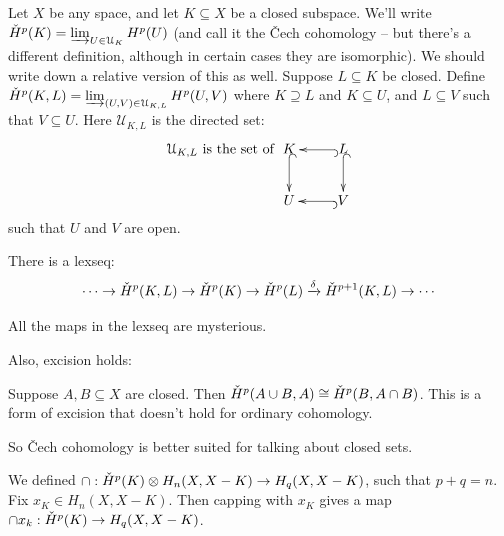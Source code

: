 Let $X$ be any space, and let $K\subseteq X$ be a closed subspace. We'll write $\check{H}^p(K)=\varinjlim_{U\in\mathcal{U}_K} H^p(U)$ (and call it the \v{C}ech cohomology -- but there's a different definition, although in certain cases they are isomorphic). We should write down a relative version of this as well. Suppose $L\subseteq K$ be closed. Define $\check{H}^p(K,L)=\varinjlim_{(U,V)\in\mathcal{U}_{K,L}} H^p(U,V)$ where $K\supseteq L$ and $K\subseteq U$, and $L\subseteq V$ such that $V\subseteq U$. Here $\mathcal{U}_{K,L}$ is the directed set:
\begin{equation*}
\mathcal{U}_{K,L}\text{ is the set of }\xymatrix{K\ar@{^(->}[d] & L\ar@{^(->}[d]\ar@{^(->}[l] \\ U & V\ar@{^(->}[l]}
\end{equation*}
such that $U$ and $V$ are open.
\begin{theorem}
There is a lexseq:
\begin{equation*}
\cdots\to\check{H}^p(K,L)\to\check{H}^p(K)\to\check{H}^p(L)\xrightarrow{\delta}\check{H}^{p+1}(K,L)\to\cdots
\end{equation*}
\end{theorem}
All the maps in the lexseq are mysterious.

Also, excision holds:
\begin{theorem}[Excision]
Suppose $A,B\subseteq X$ are closed. Then $\check{H}^p(A\cup B,A)\cong\check{H}^p(B,A\cap B)$. This is a form of excision that doesn't hold for ordinary cohomology.
\end{theorem}
So \v{C}ech cohomology is better suited for talking about closed sets. 

We defined $\cap:\check{H}^p(K)\otimes H_n(X,X-K)\to H_q(X,X-K)$, such that $p+q=n$. Fix $x_K\in H_n(X,X-K)$. Then capping with $x_K$ gives a map $\cap x_k:\check{H}^p(K)\to H_q(X,X-K)$.


